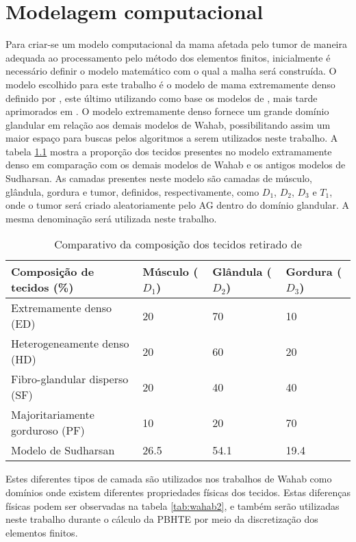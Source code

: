 \chapter{Modelagem computacional}
\label{sec:model}
Para criar-se um modelo computacional da mama afetada pelo tumor de maneira adequada ao processamento pelo método dos elementos finitos, inicialmente é necessário definir o modelo matemático com o qual a malha será construída. O modelo escolhido para este trabalho é o modelo de mama extremamente denso definido por , este último utilizando como base os modelos de , mais tarde aprimorados em \cite{ng2001improved}. O modelo extremamente denso fornece um grande domínio glandular em relação aos demais modelos de Wahab, possibilitando assim um maior espaço para buscas pelos algoritmos a serem utilizados neste trabalho. A tabela \ref{tab:wahab1} mostra a proporção dos tecidos presentes no modelo extramamente denso em comparação com os demais modelos de Wahab e os antigos modelos de Sudharsan. As camadas presentes neste modelo são camadas de músculo, glândula, gordura e tumor, definidos, respectivamente, como $D_1$, $D_2$, $D_3$ e $T_1$, onde o tumor será criado aleatoriamente pelo AG dentro do domínio glandular. A mesma denominação será utilizada neste trabalho.

\begin{table}[!ht]
    \centering
    \begin{tabularx}{\textwidth}{|lXXX|}
    \hline
    Composição de tecidos (\%) & Músculo ($D_1$) & Glândula ($D_2$) & Gordura ($D_3$)  \\ \hline
    Extremamente denso (ED) & 20 & 70 & 10 \\
    Heterogeneamente denso (HD) & 20 & 60 & 20 \\
    Fibro-glandular disperso (SF) & 20 & 40 & 40 \\
    Majoritariamente gorduroso (PF) & 10 & 20 & 70 \\
    Modelo de Sudharsan & 26.5 & 54.1 & 19.4 \\ \hline
    \end{tabularx}
    \caption{Comparativo da composição dos tecidos retirado de }
    \label{tab:wahab1}
\end{table}

Estes diferentes tipos de camada são utilizados nos trabalhos de Wahab como domínios onde existem diferentes propriedades físicas dos tecidos. Estas diferenças físicas podem ser observadas na tabela \ref{tab:wahab2}, e também serão utilizadas neste trabalho durante o cálculo da PBHTE por meio da discretização dos elementos finitos.

